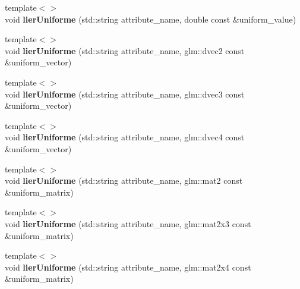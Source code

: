 \begin{DoxyCompactItemize}
\item 
\hypertarget{classopengl_1_1_programme_aee4e82a2c7e972da7a82ffae9c38397e}{{\footnotesize template$<$$>$ }\\void {\bfseries lier\-Uniforme} (std\-::string attribute\-\_\-name, double const \&uniform\-\_\-value)}\label{classopengl_1_1_programme_aee4e82a2c7e972da7a82ffae9c38397e}

\item 
\hypertarget{classopengl_1_1_programme_a0cc2298b3ed6b8075b0ef15ef4881dcc}{{\footnotesize template$<$$>$ }\\void {\bfseries lier\-Uniforme} (std\-::string attribute\-\_\-name, glm\-::dvec2 const \&uniform\-\_\-vector)}\label{classopengl_1_1_programme_a0cc2298b3ed6b8075b0ef15ef4881dcc}

\item 
\hypertarget{classopengl_1_1_programme_a7dc32e56eeb5b6170493135d510e2982}{{\footnotesize template$<$$>$ }\\void {\bfseries lier\-Uniforme} (std\-::string attribute\-\_\-name, glm\-::dvec3 const \&uniform\-\_\-vector)}\label{classopengl_1_1_programme_a7dc32e56eeb5b6170493135d510e2982}

\item 
\hypertarget{classopengl_1_1_programme_a4feb65adc2124550a5260d30503138e5}{{\footnotesize template$<$$>$ }\\void {\bfseries lier\-Uniforme} (std\-::string attribute\-\_\-name, glm\-::dvec4 const \&uniform\-\_\-vector)}\label{classopengl_1_1_programme_a4feb65adc2124550a5260d30503138e5}

\item 
\hypertarget{classopengl_1_1_programme_a9aa8d20c732ef4f47e7073d25dc0ce73}{{\footnotesize template$<$$>$ }\\void {\bfseries lier\-Uniforme} (std\-::string attribute\-\_\-name, glm\-::mat2 const \&uniform\-\_\-matrix)}\label{classopengl_1_1_programme_a9aa8d20c732ef4f47e7073d25dc0ce73}

\item 
\hypertarget{classopengl_1_1_programme_a428f3bb0e560ee6078debadb4ba6f157}{{\footnotesize template$<$$>$ }\\void {\bfseries lier\-Uniforme} (std\-::string attribute\-\_\-name, glm\-::mat2x3 const \&uniform\-\_\-matrix)}\label{classopengl_1_1_programme_a428f3bb0e560ee6078debadb4ba6f157}

\item 
\hypertarget{classopengl_1_1_programme_a96e8372cc909f7bc7c207cfb5832d034}{{\footnotesize template$<$$>$ }\\void {\bfseries lier\-Uniforme} (std\-::string attribute\-\_\-name, glm\-::mat2x4 const \&uniform\-\_\-matrix)}\label{classopengl_1_1_programme_a96e8372cc909f7bc7c207cfb5832d034}


\end{DoxyCompactItemize}
